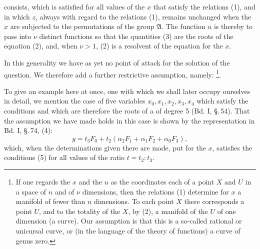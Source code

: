 consists, which is satisfied for all values of the $x$ that satisfy
the relations (1), and in which $z$, always with regard to the
relations (1), remains unchanged when the $x$ are subjected to the
permutations of the group $\mathfrak{A}$. The function $u$ is thereby
to pass into $\nu$ distinct functions
so that the quantities (3) are the roots of the equation (2), and,
when $\nu > 1$, (2) is a resolvent of the equation for the $x$.

In this generality we have as yet no point of attack for the solution
of the question. We therefore add a further restrictive assumption,
namely: 
\footnote{If one regards the $x$ and the $u$ as the coordinates
each of a point $X$ and $U$ in a space of $n$ and of $\nu$
dimensions, then the relations (1) determine for $x$ a manifold of
fewer than $n$ dimensions. To each point $X$ there corresponds a
point $U$, and to the totality of the $X$, by (2), a manifold of the
$U$ of one dimension (a curve). Our assumption is that this is a
so-called rational or unicursal curve, or (in the language of the
theory of functions) a curve of genus zero.}.

To give an example here at once, one with which we shall later occupy
ourselves in detail, we mention the case of five variables
$x_0, x_1, x_2, x_3, x_4$ which satisfy the conditions
and which are therefore the roots of a  of degree 5
(Bd. I, \S.\,54). That the assumption we have made holds in this
case is shown by the representation in Bd. I, \S.\,74, (4):
\[
y = t_3 F_0 + t_2(\alpha_2 F_1 + \alpha_1 F_2 + \alpha_0 F_3),
\]
which, when the determinations given there are made, put for the $x$,
satisfies the conditions (5) for all values of the ratio
$t = t_2 : t_3$.
